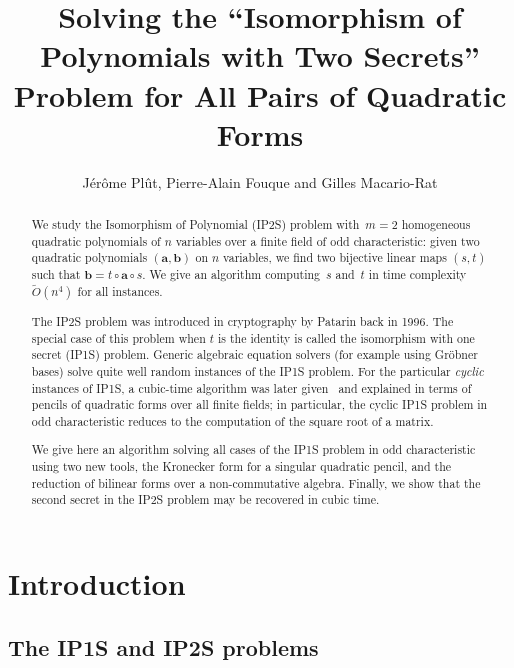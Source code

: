\documentclass{lms}
\title[Solving IP2S]%
{Solving the ``Isomorphism of Polynomials with Two Secrets'' Problem
for All Pairs of Quadratic Forms}
\author[J. Plût, P.-A. Fouque and G. Macario-Rat]%
{Jérôme Plût, Pierre-Alain Fouque and Gilles Macario-Rat}
\def\Ot{\widetilde{O}}
\begin{document}
\maketitle
\begin{abstract}%
We study the Isomorphism of Polynomial (IP2S) problem
with~$m=2$ homogeneous quadratic polynomials of $n$ variables over a finite field of odd
characteristic: given two quadratic polynomials $(\bm{a},\bm{b})$ 
on $n$ variables, we find two bijective linear maps $(s,t)$ such that
$\bm{b}=t\circ \bm{a}\circ s$. We give an algorithm computing~$s$ and~$t$
in time complexity~$\Ot(n^4)$ for all instances.

The IP2S problem was introduced in cryptography by Patarin back in 1996.
The special case of this problem when $t$ is the identity is called
the isomorphism with one secret (IP1S) problem.
Generic algebraic equation solvers (for example using Gröbner bases)
solve quite well random instances of the IP1S problem. For the particular
\emph{cyclic} instances of IP1S, a cubic-time algorithm was later
given~\cite{MPG2013} and explained in terms of pencils of quadratic forms
over all finite fields; in particular, the cyclic IP1S problem in odd
characteristic reduces to the computation of the square root of a matrix.

We give here an algorithm solving all cases of the IP1S problem in odd
characteristic using two new tools, the Kronecker form for a singular
quadratic pencil, and the reduction of bilinear forms over a non-commutative
algebra. Finally, we show that the second secret in the IP2S problem may
be recovered in cubic time.
\end{abstract}%
\maketitle
\section*{Introduction}
\subsection*{The IP1S and IP2S problems}
\end{document}
